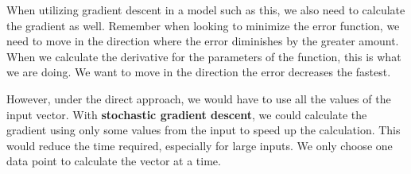 \documentclass{tufte-handout}
\begin{document}
When utilizing gradient descent in a model such as this, we also need to calculate the gradient 
as well. Remember when looking to minimize the error function, we need to move in the direction 
where the error diminishes by the greater amount. When we calculate the derivative for the
parameters of the function, this is what we are doing. We want to move in the direction the 
error decreases the fastest.

However, under the direct approach, we would have to use all the values of the input vector. 
With \textbf{stochastic gradient descent}, we could calculate the gradient using only some values
from the input to speed up the calculation.  This would reduce the time required, especially for
large inputs. We only choose one data point to calculate the vector at a time.
\end{document}

